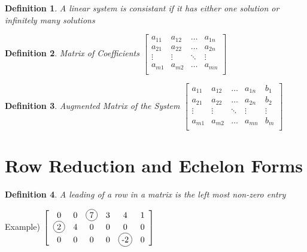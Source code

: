 \documentclass[a4paper,12pt,openany]{book}
\newcommand*\circled[1]{\tikz[baseline=(char.base)]{
            \node[shape=circle,draw,inner sep=2pt] (char) {#1};}}
\theoremstyle{defn}
\newtheorem{defn}{Definition}[section]
\theoremstyle{expl}
\begin{document}
\begin{defn}\textup{A linear system is consistant if it has either one solution or infinitely many solutions}\end{defn}

\begin{defn}\textup{Matrix of Coefficients} 
$\left[ \begin{array}{cccc}
a_{11} & a_{12} & \ldots & a_{1n}\\
a_{21} & a_{22} & \ldots & a_{2n}\\
\vdots &\vdots&\ddots& \vdots\\
a_{m1} & a_{m2} & \ldots & a_{mn}\\
\end{array} \right]$ \end{defn}


\begin{defn}\textup{Augmented Matrix of the System}
$\left[ \begin{array}{cccc|c}
a_{11} & a_{12} & \ldots & a_{1n} & b_1\\
a_{21} & a_{22} & \ldots & a_{2n} & b_2\\
\vdots &\vdots&\ddots& \vdots &\vdots\\
a_{m1} & a_{m2} & \ldots & a_{mn} & b_m\\
\end{array}\right]$ \end{defn}


\section{Row Reduction and Echelon Forms}
\begin{defn}\textup{A leading  of a row in a matrix is the left most non-zero entry} \end{defn}
Example) $\left[ \begin{array}{cccccc} 0 & 0 & \circled{7} & 3 & 4 & 1\\ \circled{2} & 4 & 0 &0 &0 &0 \\ 0 &0 &0 &0 &\circled{-2} &0 \end{array} \right] $

\end{document}

